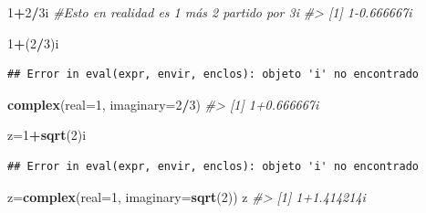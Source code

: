 \documentclass[
]{book}
\newenvironment{Shaded}{\begin{snugshade}}{\end{snugshade}}
\newcommand{\CommentTok}[1]{\textcolor[rgb]{0.56,0.35,0.01}{\textit{#1}}}
\newcommand{\DataTypeTok}[1]{\textcolor[rgb]{0.13,0.29,0.53}{#1}}
\newcommand{\DecValTok}[1]{\textcolor[rgb]{0.00,0.00,0.81}{#1}}
\newcommand{\KeywordTok}[1]{\textcolor[rgb]{0.13,0.29,0.53}{\textbf{#1}}}
\newcommand{\NormalTok}[1]{#1}
\newcommand{\OperatorTok}[1]{\textcolor[rgb]{0.81,0.36,0.00}{\textbf{#1}}}
\theoremstyle{definition}
\theoremstyle{definition}
\theoremstyle{definition}
\theoremstyle{remark}
\begin{document}
\begin{Shaded}
\begin{Highlighting}[]
\DecValTok{1}\OperatorTok{+}\DecValTok{2}\OperatorTok{/}\NormalTok{3i }\CommentTok{\#Esto en realidad es 1 más 2 partido por 3i}
\CommentTok{\#\textgreater{} [1] 1{-}0.666667i}
\end{Highlighting}
\end{Shaded}

\begin{Shaded}
\begin{Highlighting}[]
\DecValTok{1}\OperatorTok{+}\NormalTok{(}\DecValTok{2}\OperatorTok{/}\DecValTok{3}\NormalTok{)i  }
\end{Highlighting}
\end{Shaded}

\begin{verbatim}
## Error in eval(expr, envir, enclos): objeto 'i' no encontrado
\end{verbatim}

\begin{Shaded}
\begin{Highlighting}[]
\KeywordTok{complex}\NormalTok{(}\DataTypeTok{real=}\DecValTok{1}\NormalTok{, }\DataTypeTok{imaginary=}\DecValTok{2}\OperatorTok{/}\DecValTok{3}\NormalTok{)}
\CommentTok{\#\textgreater{} [1] 1+0.666667i}
\end{Highlighting}
\end{Shaded}

\begin{Shaded}
\begin{Highlighting}[]
\NormalTok{z=}\DecValTok{1}\OperatorTok{+}\KeywordTok{sqrt}\NormalTok{(}\DecValTok{2}\NormalTok{)i}
\end{Highlighting}
\end{Shaded}

\begin{verbatim}
## Error in eval(expr, envir, enclos): objeto 'i' no encontrado
\end{verbatim}

\begin{Shaded}
\begin{Highlighting}[]
\NormalTok{z=}\KeywordTok{complex}\NormalTok{(}\DataTypeTok{real=}\DecValTok{1}\NormalTok{, }\DataTypeTok{imaginary=}\KeywordTok{sqrt}\NormalTok{(}\DecValTok{2}\NormalTok{))}
\NormalTok{z}
\CommentTok{\#\textgreater{} [1] 1+1.414214i}
\end{Highlighting}
\end{Shaded}
\end{document}
